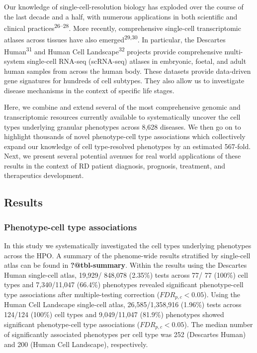 \documentclass[
sn-nature
]{sn-jnl}
\begin{document}
Our knowledge of single-cell-resolution biology has exploded over the
course of the last decade and a half, with numerous applications in both
scientific and clinical practices\textsuperscript{26--28}. More
recently, comprehensive single-cell transcriptomic atlases across
tissues have also emerged\textsuperscript{29,30}. In particular, the
Descartes Human\textsuperscript{31} and Human Cell
Landscape\textsuperscript{32} projects provide comprehensive
multi-system single-cell RNA-seq (scRNA-seq) atlases in embryonic,
foetal, and adult human samples from across the human body. These
datasets provide data-driven gene signatures for hundreds of cell
subtypes. They also allow us to investigate disease mechanisms in the
context of specific life stages.

Here, we combine and extend several of the most comprehensive genomic
and transcriptomic resources currently available to systematically
uncover the cell types underlying granular phenotypes across 8,628
diseases. We then go on to highlight thousands of novel phenotype-cell
type associations which collectively expand our knowledge of cell
type-resolved phenotypes by an estimated 567-fold. Next, we present
several potential avenues for real world applications of these results
in the context of RD patient diagnosis, prognosis, treatment, and
therapeutics development.

\subsection{Results}\label{sec-results}

\subsubsection{Phenotype-cell type
associations}\label{phenotype-cell-type-associations}

In this study we systematically investigated the cell types underlying
phenotypes across the HPO. A summary of the phenome-wide results
stratified by single-cell atlas can be found in \textbf{?@tbl-summary}.
Within the results using the Descartes Human single-cell atlas, 19,929/
848,078 (2.35\%) tests across 77/ 77 (100\%) cell types and 7,340/11,047
(66.4\%) phenotypes revealed significant phenotype-cell type
associations after multiple-testing correction (\(FDR_{p,c}<0.05\)).
Using the Human Cell Landscape single-cell atlas, 26,585/1,358,916
(1.96\%) tests across 124/124 (100\%) cell types and 9,049/11,047
(81.9\%) phenotypes showed significant phenotype-cell type associations
(\(FDR_{p,c}<0.05\)). The median number of significantly associated
phenotypes per cell type was 252 (Descartes Human) and 200 (Human Cell
Landscape), respectively.
\end{document}

